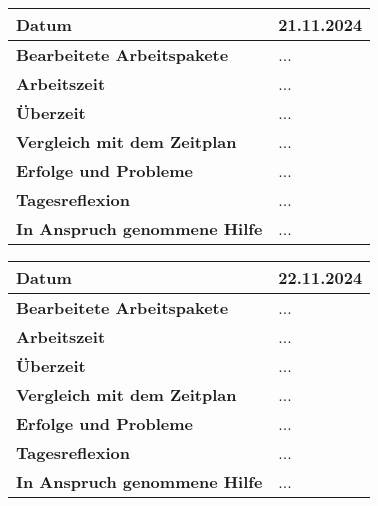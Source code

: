 \begin{longtable}{p{}|p{}}
	\hline
	\textbf{Datum}                       & 21.11.2024            \\
	\hline
	\textbf{Bearbeitete Arbeitspakete}   & ...                  \\
	\hline
	\textbf{Arbeitszeit}                 & ...                                    \\
	\hline
	\textbf{Überzeit}                    & ...                                    \\
	\hline
	\textbf{Vergleich mit dem Zeitplan}  & ... \\
	\hline
	\textbf{Erfolge und Probleme} & ...
	\\
	\hline
	\textbf{Tagesreflexion} & ...
	\\
	\hline
	\textbf{In Anspruch genommene Hilfe} & ...                              \\
	\hline
\end{longtable}\label{tab:arbeitsprotokoll-21.11.2024}
\newpage

\begin{longtable}{p{}|p{}}
	\hline
	\textbf{Datum}                       & 22.11.2024            \\
	\hline
	\textbf{Bearbeitete Arbeitspakete}   & ...                  \\
	\hline
	\textbf{Arbeitszeit}                 & ...                                    \\
	\hline
	\textbf{Überzeit}                    & ...                                    \\
	\hline
	\textbf{Vergleich mit dem Zeitplan}  & ... \\
	\hline
	\textbf{Erfolge und Probleme} & ...
	\\
	\hline
	\textbf{Tagesreflexion} & ...
	\\
	\hline
	\textbf{In Anspruch genommene Hilfe} & ...                              \\
	\hline
\end{longtable}\label{tab:arbeitsprotokoll-22.11.2024}
\newpage
